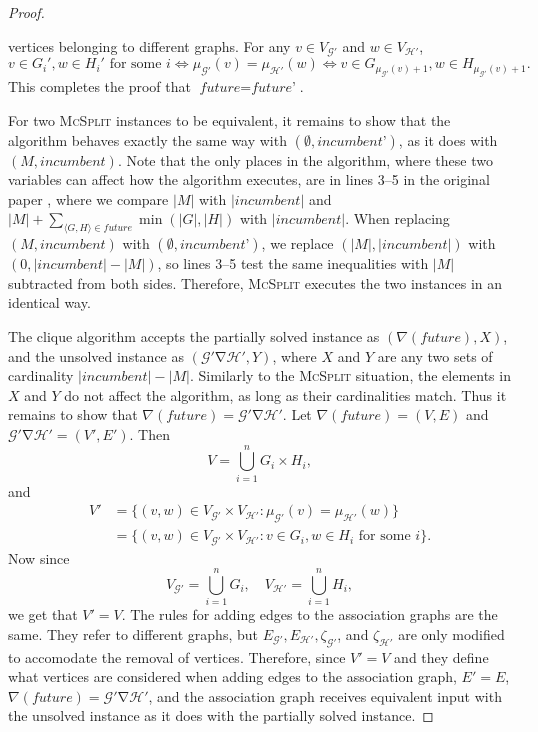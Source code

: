 \documentclass{l4proj}
\theoremstyle{definition}
\theoremstyle{remark}
\DeclareMathOperator{\nablaop}{\nabla}
\begin{document}
\begin{proof}
\begin{enumerate}
    vertices belonging to different graphs. For any $v \in V_{\mathcal{G'}}$ and
    $w \in V_{\mathcal{H'}}$,
    \[ v \in G_i', w \in H_i' \text{ for some } i \iff \mu_{\mathcal{G'}}(v) =
      \mu_{\mathcal{H'}}(w) \iff v \in G_{\mu_{\mathcal{G'}}(v)+1}, w \in
      H_{\mu_{\mathcal{G'}}(v)+1}. \]
    This completes the proof that $\textit{future} = \textit{future'}$.
  \end{enumerate}
  For two \textsc{McSplit} instances to be equivalent, it remains to show that
  the algorithm behaves exactly the same way with $(\emptyset,
  \textit{incumbent'})$, as it does with $(M, \textit{incumbent})$. Note that
  the only places in the algorithm, where these two variables can affect how the
  algorithm executes, are in lines 3--5 in the original paper
  \cite{DBLP:conf/ijcai/McCreeshPT17}, where we compare $|M|$ with
  $|\textit{incumbent}|$ and $|M| + \sum_{\langle G, H \rangle \in
    \textit{future}} \min(|G|, |H|)$ with $|\textit{incumbent}|$. When replacing
  $(M, \textit{incumbent})$ with $(\emptyset, \textit{incumbent'})$, we replace
  $(|M|, |\textit{incumbent}|)$ with $(0, |\textit{incumbent}| - |M|)$, so lines
  3--5 test the same inequalities with $|M|$ subtracted from both sides.
  Therefore, \textsc{McSplit} executes the two instances in an identical way.
  
  The clique algorithm accepts the partially solved instance as
  $(\nabla(\textit{future}), X)$, and the unsolved instance as $(\mathcal{G'}
  \nablaop \mathcal{H'}, Y)$, where $X$ and $Y$ are any two sets of cardinality
  $|\textit{incumbent}| - |M|$. Similarly to the \textsc{McSplit} situation, the
  elements in $X$ and $Y$ do not affect the algorithm, as long as their
  cardinalities match. Thus it remains to show that $\nabla(\textit{future}) =
  \mathcal{G'} \nablaop \mathcal{H'}$. Let $\nabla(\textit{future}) = (V, E)$ and
  $\mathcal{G'} \nablaop \mathcal{H'} = (V', E')$. Then
  \[ V = \bigcup_{i = 1}^n G_i \times H_i, \]
  and
  \begin{align*}
  V' &= \{ (v, w) \in V_{\mathcal{G'}} \times V_{\mathcal{H'}} :
       \mu_{\mathcal{G'}}(v) = \mu_{\mathcal{H'}}(w) \} \\
     &= \{ (v, w) \in V_{\mathcal{G'}} \times V_{\mathcal{H'}} : v \in G_i, w \in H_i \text{ for some } i \}.
  \end{align*}
  Now since
  \[ V_{\mathcal{G'}} = \bigcup_{i = 1}^n G_i, \quad V_{\mathcal{H'}} =
    \bigcup_{i=1}^n H_i, \]
  we get that $V' = V$. The rules for adding edges to the association graphs are
  the same. They refer to different graphs, but $E_{\mathcal{G'}},
  E_{\mathcal{H'}}, \zeta_{\mathcal{G'}}$, and $\zeta_{\mathcal{H'}}$ are only
  modified to accomodate the removal of vertices. Therefore, since $V' = V$ and
  they define what vertices are considered when adding edges to the association
  graph, $E' = E$, $\nabla(\textit{future}) = \mathcal{G'} \nablaop
  \mathcal{H'}$, and the association graph receives equivalent input with the
  unsolved instance as it does with the partially solved instance.
\end{proof}
\end{document}
